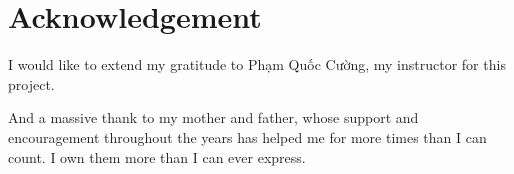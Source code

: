\hypertarget{acknowledgement}{%
\chapter*{Acknowledgement}\label{acknowledgement}}

I would like to extend my gratitude to Phạm Quốc Cường, my instructor for this project.

And a massive thank to my mother and father, whose support and encouragement throughout the years
has helped me for more times than I can count. I own them more than I can ever express.
